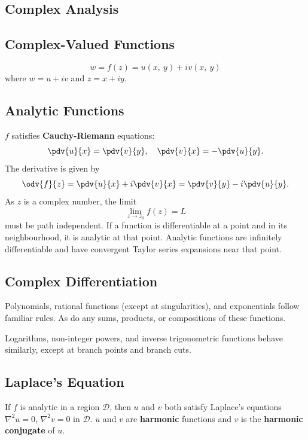 \documentclass{article}
\begin{document}
\begin{multicols*}{3}
    \section{Complex Analysis}
    \subsection{Complex-Valued Functions}
    \begin{equation*}
        w = f\left( z \right) = u\left( x, \: y \right) + i v\left( x, \: y \right)
    \end{equation*}
    where \(w = u + iv\) and \(z = x + iy\).
    \subsection{Analytic Functions}
    \(f\) satisfies \textbf{Cauchy-Riemann} equations:
    \begin{equation*}
        \pdv{u}{x} = \pdv{v}{y}, \quad \pdv{v}{x} = -\pdv{u}{y}.
    \end{equation*}
    The derivative is given by
    \begin{equation*}
        \odv{f}{z} = \pdv{u}{x} + i \pdv{v}{x} = \pdv{v}{y} - i \pdv{u}{y}.
    \end{equation*}
    As \(z\) is a complex number, the limit
    \begin{equation*}
        \lim_{z \to z_0} f\left( z \right) = L
    \end{equation*}
    must be path independent.
    If a function is differentiable at a point and in its neighbourhood,
    it is analytic at that point.
    Analytic functions are infinitely differentiable and
    have convergent Taylor series expansions near that point.
    \subsection{Complex Differentiation}
    Polynomials, rational functions (except at singularities), and exponentials
    follow familiar rules. As do any sums, products, or compositions of these functions.

    Logarithms, non-integer powers, and inverse trigonometric functions behave similarly,
    except at branch points and branch cuts.
    \subsection{Laplace's Equation}
    If \(f\) is analytic in a region \(\mathcal{D}\),
    then \(u\) and \(v\) both satisfy Laplace's equations
    \(\nabla^2 u = 0\), \(\nabla^2 v = 0\)
    in \(\mathcal{D}\). \(u\) and \(v\) are \textbf{harmonic} functions
    and \(v\) is the \textbf{harmonic conjugate} of \(u\).

\end{multicols*}
\end{document}
